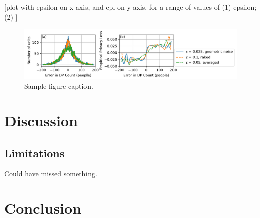 \documentclass{article}
\begin{document}
[plot with epsilon on x-axis, and epl on y-axis, for a range of values of
(1) epsilon; (2) ]


\begin{figure}
  \includegraphics[width=\linewidth]{fig.pdf}
 \caption{Sample figure caption.}
\end{figure}

\section{Discussion}

\subsection{Limitations}
Could have missed something.

\section{Conclusion}


\end{document}
